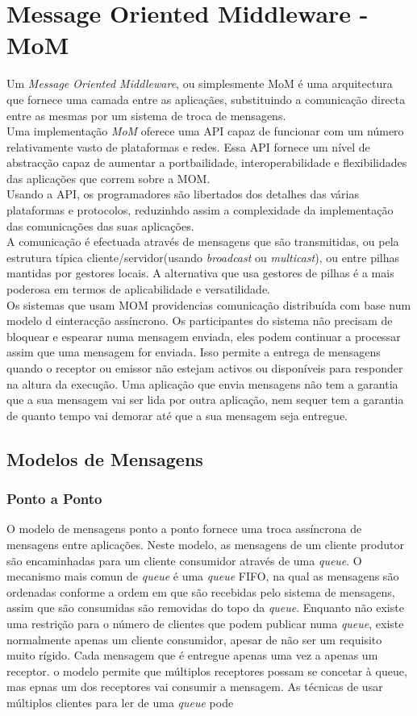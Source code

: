 \section{Message Oriented Middleware - MoM}
Um \textit{Message Oriented Middleware}, ou simplesmente MoM é uma arquitectura que fornece uma camada entre as aplicaçães, substituindo a comunicação directa entre as mesmas por um sistema de troca de mensagens.\\
Uma implementação \textit{MoM} oferece uma API capaz de funcionar com um número relativamente vasto de plataformas e redes. Essa API fornece um nível de abstracção capaz de aumentar a portbailidade, interoperabilidade e flexibilidades das aplicações que correm sobre a MOM.\\
Usando a API, os programadores são libertados dos detalhes das várias plataformas e protocolos, reduzinhdo assim a complexidade da implementação das comunicações das suas aplicações.\\
A comunicação é efectuada através de mensagens que são transmitidas, ou pela estrutura típica cliente/servidor(usando \textit{broadcast} ou \textit{multicast}), ou entre pilhas mantidas por gestores locais. A alternativa que usa gestores de pilhas é a mais poderosa em termos de aplicabilidade e versatilidade.\\ 
Os sistemas que usam MOM providencias comunicação distribuída com base num modelo d einteracção assíncrono. Os participantes do sistema não precisam de bloquear e espearar numa mensagem enviada, eles podem continuar a processar assim que uma mensagem for enviada. Isso permite a entrega de mensagens quando o receptor ou emissor não estejam activos ou disponíveis para responder na altura da execução. Uma aplicação que envia mensagens não tem a garantia que a sua mensagem vai ser lida por outra aplicação, nem sequer tem a garantia de quanto tempo vai demorar até que a sua mensagem seja entregue. 
\subsection{Modelos de Mensagens}
\subsubsection{Ponto a Ponto}
O modelo de mensagens ponto a ponto fornece uma troca assíncrona de mensagens entre aplicações. Neste modelo, as mensagens de um cliente produtor são encaminhadas para um cliente consumidor através de uma \textit{queue}. O mecanismo mais comun de \textit{queue} é uma \textit{queue} FIFO, na qual as mensagens são ordenadas conforme a ordem em que são recebidas pelo sistema de mensagens, assim que são consumidas são removidas do topo da \textit{queue}. 
Enquanto não existe uma restrição para o número de clientes que podem publicar numa \textit{queue}, existe normalmente apenas um cliente consumidor, apesar de não ser um requisito muito rígido. Cada mensagem que é entregue apenas uma vez a apenas um receptor. o modelo permite que múltiplos receptores possam se concetar à queue, mas epnas um dos receptores vai consumir a mensagem. As técnicas de usar múltiplos clientes para ler de uma \textit{queue} pode  
